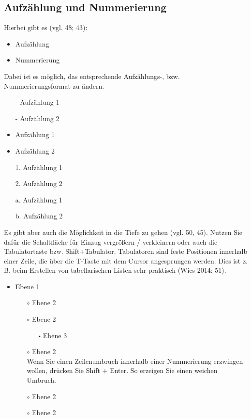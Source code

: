 \documentclass[a4paper, 11pt]{scrartcl}
\begin{document}
	\subsection*{Aufzählung und Nummerierung}
	Hierbei gibt es (vgl. 48; 43):\\
	\begin{itemize}
		\vspace{-6mm}
		\setlength\itemsep{0.01mm}
		\item Aufzählung
		\item Nummerierung \\
	\end{itemize}
	Dabei ist es möglich, das entsprechende Aufzählungs-, bzw. Nummerierungsformat zu ändern.\\
	\begin{itemize}
		\vspace{-6mm}
		\setlength\itemsep{0.01mm}
		\item[-] Aufzählung 1
		\item[-] Aufzählung 2
		\vspace{4mm}
		\item Aufzählung 1
		\item Aufzählung 2
		\vspace{4mm}
		\item[1.] Aufzählung 1
		\item[2.] Aufzählung 2
		\vspace{4mm}
		\item[a.] Aufzählung 1
		\item[b.] Aufzählung 2
		\vspace{4mm}
	\end{itemize}
	\begin{justify}
		Es gibt aber auch die Möglichkeit in die Tiefe zu gehen (vgl. 50, 45). Nutzen Sie dafür die Schaltfläche für Einzug vergrößern / verkleinern oder auch die Tabulatortaste bzw. Shift+Tabulator. Tabulatoren sind feste Positionen innerhalb einer Zeile, die über die T-Taste mit dem Cursor angesprungen werden. Dies ist z. B. beim Erstellen von tabellarischen Listen sehr praktisch (Wies 2014: 51).
	\end{justify}
	\begin{itemize}
		\item Ebene 1
		\begin{itemize}
			\item[$\circ$] Ebene 2
			\item[$\circ$] Ebene 2
			\begin{itemize}
				\item[$\smblksquare$] Ebene 3
			\end{itemize}
			\item[$\circ$] Ebene 2 \\
			Wenn Sie einen Zeilenumbruch innerhalb einer Nummerierung erzwingen wollen, drücken Sie Shift + Enter. So erzeigen Sie einen weichen Umbruch.
			\item[$\circ$] Ebene 2
			\item[$\circ$] Ebene 2
		\end{itemize}
	\end{itemize}
	\newpage
\end{document}
